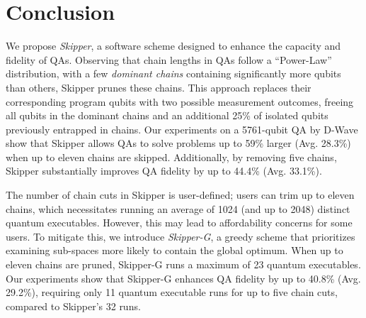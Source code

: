 \section{Conclusion}

We propose \emph{Skipper}, a software scheme designed to enhance the capacity and fidelity of QAs. 
Observing that chain lengths in QAs follow a ``Power-Law'' distribution, with a few \emph{dominant chains} containing significantly more qubits than others, Skipper prunes these chains. 
This approach replaces their corresponding program qubits with two possible measurement outcomes, freeing all qubits in the dominant chains and an additional 25\% of isolated qubits previously entrapped in chains. 
Our experiments on a 5761-qubit QA by D-Wave show that Skipper allows QAs to solve problems up to 59\% larger (Avg. 28.3\%) when up to eleven chains are skipped. 
Additionally, by removing five chains, Skipper substantially improves QA fidelity by up to 44.4\% (Avg. 33.1\%). 

The number of chain cuts in Skipper is user-defined; users can trim up to eleven chains, which necessitates running an average of 1024 (and up to 2048) distinct quantum executables. However, 
this may lead to affordability concerns for some users. 
To mitigate this, we introduce \emph{Skipper-G}, a greedy scheme that prioritizes examining sub-spaces more likely to contain the global optimum. 
When up to eleven chains are pruned, Skipper-G runs a maximum of 23 quantum executables. 
Our experiments show that Skipper-G enhances QA fidelity by up to 40.8\% (Avg. 29.2\%), requiring only 11 quantum executable runs for up to five chain cuts, compared to Skipper's 32 runs.


